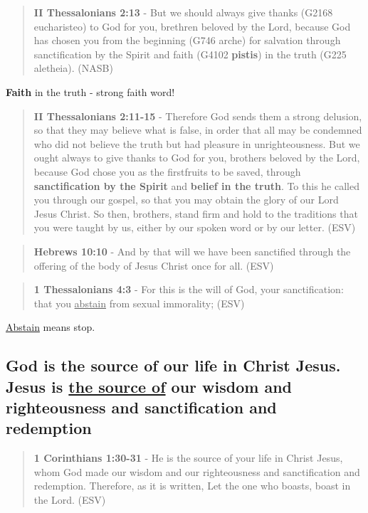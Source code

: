 \documentclass[11pt]{article}
\begin{document}
\begin{quote}
\textbf{II Thessalonians 2:13} - But we should always give thanks (G2168 eucharisteo) to God for you, brethren beloved by the Lord, because God has chosen you from the beginning (G746 arche) for salvation through sanctification by the Spirit and faith (G4102 \textbf{pistis}) in the truth (G225 aletheia). (NASB)
\end{quote}

\textbf{Faith} in the truth - strong faith word!

\begin{quote}
\textbf{II Thessalonians 2:11-15} - Therefore God sends them a strong delusion, so that they may believe what is false, in order that all may be condemned who did not believe the truth but had pleasure in unrighteousness. But we ought always to give thanks to God for you, brothers beloved by the Lord, because God chose you as the firstfruits to be saved, through \textbf{sanctification by the Spirit} and \textbf{belief in the truth}. To this he called you through our gospel, so that you may obtain the glory of our Lord Jesus Christ. So then, brothers, stand firm and hold to the traditions that you were taught by us, either by our spoken word or by our letter.  (ESV)
\end{quote}

\begin{quote}
\textbf{Hebrews 10:10} - And by that will we have been sanctified through the offering of the body of Jesus Christ once for all. (ESV)
\end{quote}

\begin{quote}
\textbf{1 Thessalonians 4:3} -  For this is the will of God, your sanctification: that you \uline{abstain} from sexual immorality;  (ESV)
\end{quote}

\uline{Abstain} means stop.

\subsection{God is the source of our life in Christ Jesus. Jesus is \underline{the source of} our wisdom and righteousness and sanctification and redemption}
\label{sec:orgede0f1f}
\begin{quote}
\textbf{1 Corinthians 1:30-31} -  He is the source of your life in Christ Jesus, whom God made our wisdom and our righteousness and sanctification and redemption.  Therefore, as it is written, Let the one who boasts, boast in the Lord.  (ESV)
\end{quote}
\end{document}
